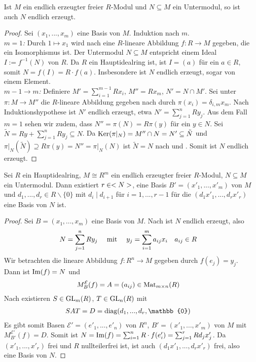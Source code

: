 \begin{lemma}
	Ist $M$ ein endlich erzeugter freier $R$-Modul und $N\subseteq M$ ein Untermodul, so ist auch $N$ endlich erzeugt.
\end{lemma}
\begin{proof}
	Sei $(x_1,...,x_m)$ eine Basis von $M$. Induktion nach $m$. \\
	\emph{$m=1$:} Durch $1\mapsto x_1$ wird nach  eine $R$-lineare Abbildung $f:R\to M$ gegeben, die ein Isomorphismus ist. Der Untermodul $N\subseteq M$ entspricht einem Ideal $I:=f^{-1}(N)$ von $R$. Da $R$ ein Hauptidealring ist, ist $I=(a)$ für ein $a\in R$, somit $N=f(I)=R\cdot f(a)$. Insbesondere ist $N$ endlich erzeugt, sogar von einem Element. \\
	\emph{$m-1\to m$:} Definiere $M'=\sum_{i=1}^{m-1}Rx_i$, $M''=Rx_m$, $N'=N\cap M'$. Sei unter $\pi: M\to M''$ die $R$-lineare Abbildung gegeben nach  durch $\pi(x_i)=\delta_{i,m}x_m$. Nach Induktionshypothese ist $N'$ endlich erzeugt, etwa $N'=\sum_{j=1}^n Ry_j$. Aus dem Fall $m=1$ sehen wir zudem, dass $N''=\pi(N)=R\pi(y)$ für ein $y\in N$. Sei $\tilde{N}=Ry+\sum_{j=1}^n Ry_j\subseteq N$. Da $\operatorname{Ker}(\pi\vert_N)=M''\cap N=N'\subseteq\tilde{N}$ und $\pi\vert_N(\tilde{N})\supseteq R\pi(y)=N''=\pi\vert_N(N)$ ist $\tilde{N}=N$ nach  und . Somit ist $N$ endlich erzeugt.
\end{proof}

\begin{proposition}
	Sei $R$ ein Hauptidealring, $M\cong R^m$ ein endlich erzeugter freier $R$-Modul, $N\subseteq M$ ein Untermodul. Dann existiert $r\in<N>$, eine Basis $B'=(x'_1,...,x'_m)$ von $M$ und $d_1,...,d_r\in R\backslash\{0\}$ mit $d_i\mid d_{i+1}$ für $i=1,...,r-1$ für die $(d_1x'_1,...,d_rx'_r)$ eine Basis von $N$ ist.
\end{proposition}
\begin{proof}
	Sei $B=(x_1,...,x_m)$ eine Basis von $M$. Nach  ist $N$ endlich erzeugt, also 
	\begin{align}
		N=\sum_{j=1}^n Ry_j\quad\text{ mit }\quad y_j=\sum_{i=1}^m a_{ij}x_i\quad a_{ij}\in R\notag
	\end{align}
	Wir betrachten die lineare Abbildung $f:R^n\to M$ gegeben durch $f(e_j)=y_j$. Dann ist $\operatorname{Im}(f)=N$ und 
	\begin{align}
		M_B^{\mathcal{E}}(f)=A=(a_{ij})\in\operatorname{Mat}_{m\times n}(R)\notag
	\end{align}
	Nach  existieren $S\in\operatorname{GL}_m(R)$, $T\in\operatorname{GL}_n(R)$ mit
	\begin{align}
		SAT=D=\diag(d_1,...,d_r,\mathbb{0})\notag
	\end{align}
	Es gibt somit Basen $\mathcal{E}'=(e'_1,...,e'_n)$ von $R^n$, $B'=(x'_1,...,x'_m)$ von $M$ mit $M_{B'}^{\mathcal{E}'}(f)=D$. Somit ist $N=\operatorname{Im}(f)=\sum_{i=1}^n R\cdot f(e'_i)=\sum_{j=1}^r Rd_jx'_j$. Da $(x'_1,...,x'_r)$ frei und $R$ nullteilerfrei ist, ist auch $(d_1x'_1,...,d_rx'_r)$ frei, also eine Basis von $N$.
\end{proof}

